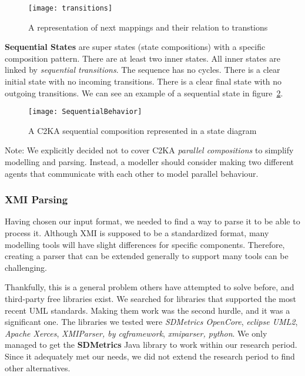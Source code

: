 \begin{figure}[ht]
    \centering
    \texttt{[image: transitions]}
    \caption{A representation of next mappings and their relation to transtions}
    \label{fig:transition}
\end{figure}

\textbf{Sequential States} are super states (state compositions) with a specific composition pattern.
There are at least two inner states.
All inner states are linked by \textit{sequential transitions}.
The sequence has no cycles.
There is a clear initial state with no incoming transitions.
There is a clear final state with no outgoing transitions.
We can see an example of a sequential state in figure~\ref{fig:sequential}.

\begin{figure}[ht]
    \centering
    \texttt{[image: SequentialBehavior]}
    \caption{A C2KA sequential composition represented in a state diagram}
    \label{fig:sequential}
\end{figure}

Note: We explicitly decided not to cover C2KA \textit{parallel compositions} to simplify modelling and parsing.
Instead, a modeller should consider making two different agents that communicate
with each other to model parallel behaviour.

\subsubsection{XMI Parsing}\label{subsubsec:parsing}
Having chosen our input format, we needed to find a way to parse it to be able to process it.
Although XMI is supposed to be a standardized format,
many modelling tools will have slight differences for specific components.
Therefore, creating a parser that can be extended generally to support many tools can be challenging.

Thankfully, this is a general problem others have attempted to solve before, and third-party free libraries exist.
We searched for libraries that supported the most recent UML standards.
Making them work was the second hurdle, and it was a significant one.
The libraries we tested were \textit{SDMetrics OpenCore},
\textit{eclipse UML2}, \textit{Apache Xerces}, \textit{XMIParser, by cqframework}, \textit{xmiparser, python}.
We only managed to get the \textbf{SDMetrics} Java library to work within our research period.
Since it adequately met our needs, we did not extend the research period to find other alternatives.

